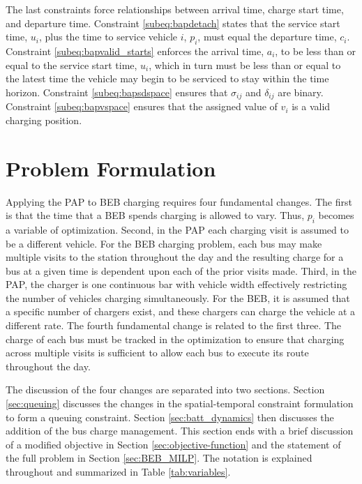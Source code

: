 \documentclass[utf8]{FrontiersinHarvard}
\begin{document}
The last constraints force relationships between arrival time, charge start time, and departure time. Constraint
\eqref{subeq:bapdetach} states that the service start time, $u_i$, plus the time to service vehicle $i$, $p_i$, must
equal the departure time, $c_i$. Constraint \eqref{subeq:bapvalid_starts} enforces the arrival time, $a_i$, to be less
than or equal to the service start time, $u_i$, which in turn must be less than or equal to the latest time the vehicle
may begin to be serviced to stay within the time horizon. Constraint \eqref{subeq:bapsdspace} ensures that $\sigma_{ij}$ and
$\delta_{ij}$ are binary. Constraint \eqref{subeq:bapvspace} ensures that the assigned value of $v_i$ is a valid charging
position.

%
\section{Problem Formulation}  \label{sec:problemformulation}
Applying the PAP to BEB charging requires four fundamental changes. The first is that the time that a BEB spends
charging is allowed to vary. Thus, $p_i$ becomes a variable of optimization. Second, in the PAP each charging visit is
assumed to be a different vehicle. For the BEB charging problem, each bus may make multiple visits to the station
throughout the day and the resulting charge for a bus at a given time is dependent upon each of the prior visits made.
Third, in the PAP, the charger is one continuous bar with vehicle width effectively restricting the number of vehicles
charging simultaneously. For the BEB, it is assumed that a specific number of chargers exist, and these chargers can
charge the vehicle at a different rate. The fourth fundamental change is related to the first three. The charge of each
bus must be tracked in the optimization to ensure that charging across multiple visits is sufficient to allow each bus
to execute its route throughout the day.

The discussion of the four changes are separated into two sections. Section \ref{sec:queuing} discusses the changes in
the spatial-temporal constraint formulation to form a queuing constraint. Section \ref{sec:batt_dynamics} then discusses
the addition of the bus charge management. This section ends with a brief discussion of a modified objective in Section
\ref{sec:objective-function} and the statement of the full problem in Section \ref{sec:BEB_MILP}. The notation is
explained throughout and summarized in Table \ref{tab:variables}.
\end{document}
